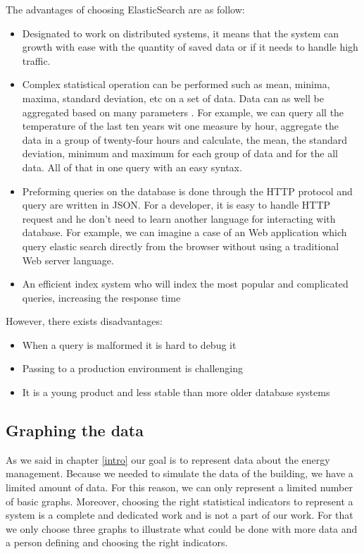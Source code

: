\documentclass{acm_proc_article-sp}
\begin{document}
The advantages of choosing ElasticSearch are as follow:
\begin{itemize}
\item Designated to work on distributed systems, it means that the system can growth with ease with the quantity of saved data or if it needs to handle high traffic.
\item Complex statistical operation can be performed such as mean, minima, maxima, standard deviation, etc on a set of data. Data can as well be aggregated based on many parameters \cite{es_agg}. For example, we can query all the temperature of the last ten years wit one measure by hour, aggregate the data in a group of twenty-four hours and calculate, the mean, the standard deviation, minimum and maximum for each group of data and for the all data. All of that in one query with an easy syntax.
\item Preforming queries on the database is done through the HTTP protocol and query are written in JSON. For a developer, it is easy to handle HTTP request and he don’t need to learn another language for interacting with database. For example, we can imagine a case of an Web application which query elastic search directly from the browser without using a traditional Web server language.
\item An efficient index system who will index the most popular and complicated queries, increasing the response time
\end{itemize}
However, there exists disadvantages:
\begin{itemize}
\item When a query is malformed it is hard to debug it
\item Passing to a production environment is challenging
\item It is a young product and less stable than more older database systems
\end{itemize}

\subsection{Graphing the data}
As we said in chapter \ref{intro} our goal is to represent data about the energy management. Because we needed to simulate the data of the building, we have a limited amount of data. For this reason, we can only represent a limited number of basic graphs. Moreover, choosing the right statistical indicators to represent a system is a complete and dedicated work and is not a part of our work. For that we only choose three graphs to illustrate what could be done with more data and a person defining and choosing the right indicators.
\end{document}
